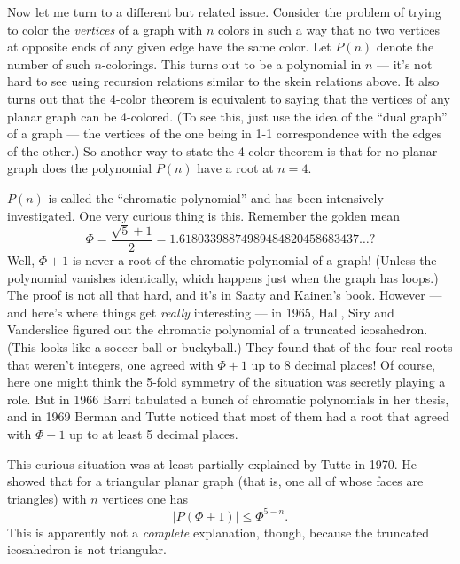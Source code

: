 \documentclass{article}
\begin{document}
Now let me turn to a different but related issue. Consider the problem
of trying to color the \emph{vertices} of a graph with \(n\) colors in
such a way that no two vertices at opposite ends of any given edge have
the same color. Let \(P(n)\) denote the number of such \(n\)-colorings.
This turns out to be a polynomial in \(n\) --- it's not hard to see
using recursion relations similar to the skein relations above. It also
turns out that the 4-color theorem is equivalent to saying that the
vertices of any planar graph can be 4-colored. (To see this, just use
the idea of the ``dual graph'' of a graph --- the vertices of the one
being in 1-1 correspondence with the edges of the other.) So another way
to state the 4-color theorem is that for no planar graph does the
polynomial \(P(n)\) have a root at \(n = 4\).

\(P(n)\) is called the ``chromatic polynomial'' and has been intensively
investigated. One very curious thing is this. Remember the golden mean
\[\Phi = \frac{\sqrt{5} + 1}{2} = 1.61803398874989484820458683437\ldots?\]
Well, \(\Phi + 1\) is never a root of the chromatic polynomial of a graph!
(Unless the polynomial vanishes identically, which happens just when the
graph has loops.) The proof is not all that hard, and it's in Saaty and
Kainen's book. However --- and here's where things get \emph{really}
interesting --- in 1965, Hall, Siry and Vanderslice figured out the
chromatic polynomial of a truncated icosahedron. (This looks like a
soccer ball or buckyball.) They found that of the four real roots that
weren't integers, one agreed with \(\Phi + 1\) up to 8 decimal places! Of
course, here one might think the 5-fold symmetry of the situation was
secretly playing a role. But in 1966 Barri tabulated a bunch of
chromatic polynomials in her thesis, and in 1969 Berman and Tutte
noticed that most of them had a root that agreed with \(\Phi + 1\) up to at
least 5 decimal places.

This curious situation was at least partially explained by Tutte in
1970. He showed that for a triangular planar graph (that is, one all of
whose faces are triangles) with \(n\) vertices one has
\[|P(\Phi + 1)| \leqslant \Phi^{5-n}.\] This is apparently not a
\emph{complete} explanation, though, because the truncated icosahedron
is not triangular.
\end{document}
